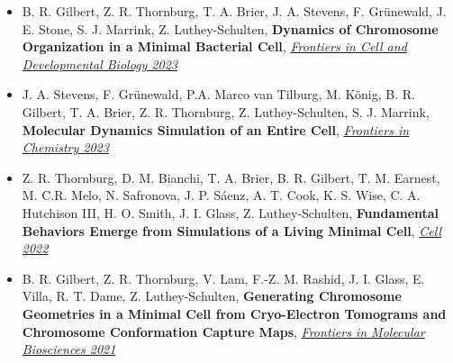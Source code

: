 \documentclass[letterpaper,10pt]{article}
\begin{document}
\begin{itemize}[leftmargin=0.35in, label={}, labelindent=5pt,itemindent=-15pt]
  \setlength\itemsep{-0.4em}
\item \textcolor{color1}{B. R. Gilbert}, Z. R. Thornburg, T. A. Brier, J. A. Stevens, F. Gr\"{u}newald, J. E. Stone, S. J. Marrink, Z. Luthey-Schulten, \textbf{Dynamics of Chromosome Organization in a Minimal Bacterial Cell}, \href{https://doi.org/10.3389/fcell.2023.1214962}{\textit{Frontiers in Cell and Developmental Biology 2023}}%
\item J. A. Stevens, F. Gr\"{u}newald, P.A. Marco van Tilburg, M. K\"{o}nig, \textcolor{color1}{B. R. Gilbert}, T. A. Brier, Z. R. Thornburg, Z. Luthey-Schulten, S. J. Marrink, \textbf{Molecular Dynamics Simulation of an Entire Cell}, \href{https://doi.org/10.3389/fchem.2023.1106495}{\textit{Frontiers in Chemistry 2023}}%
\item Z. R. Thornburg, D. M. Bianchi, T. A. Brier, \textcolor{color1}{B. R. Gilbert}, T. M. Earnest, M. C.R. Melo, N. Safronova, J. P. S\'{a}enz, A. T. Cook, K. S. Wise, C. A. Hutchison III, H. O. Smith, J. I. Glass, Z. Luthey-Schulten, \textbf{Fundamental Behaviors Emerge from Simulations of a Living Minimal Cell}, \href{https://doi.org/10.1016/j.cell.2021.12.025}{\textit{Cell 2022}}%
\item \textcolor{color1}{B. R. Gilbert}, Z. R. Thornburg, V. Lam, F.-Z. M. Rashid, J. I. Glass, E. Villa, R. T. Dame, Z. Luthey-Schulten, \textbf{Generating Chromosome Geometries in a Minimal Cell from Cryo-Electron Tomograms and Chromosome Conformation Capture Maps}, \href{https://doi.org/10.3389/fmolb.2021.644133}{\textit{Frontiers in Molecular Biosciences 2021}}%

\end{itemize}
\end{document}
